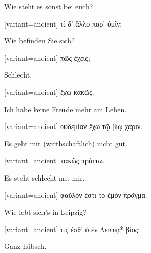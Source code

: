 Wie steht es sonst bei euch?

\switchcolumn

\begin{greek}[variant=ancient]%
τί δ' ἄλλο παρ' ὑμῖν;

\end{greek}%
\switchcolumn*

Wie befinden Sie sich?

\switchcolumn

\begin{greek}[variant=ancient]%
πῶς ἔχεις;

\end{greek}%
\switchcolumn*

Schlecht.

\switchcolumn

\begin{greek}[variant=ancient]%
ἔχω κακῶς.

\end{greek}%
\switchcolumn*

Ich habe keine Freude mehr am Leben.

\switchcolumn

\begin{greek}[variant=ancient]%
οὐδεμίαν ἔχω τῷ βίῳ χάριν.

\end{greek}%
\switchcolumn*

Es geht mir (wirthschaftlich) nicht gut.

\switchcolumn

\begin{greek}[variant=ancient]%
κακῶς πράττω.

\end{greek}%
\switchcolumn*

Es steht schlecht mit mir.

\switchcolumn

\begin{greek}[variant=ancient]%
φαῦλόν ἐστι τὸ ἐμὸν πρᾶγμα.

\end{greek}%
\switchcolumn*

Wie lebt sich's in Leipzig?

\switchcolumn

\begin{greek}[variant=ancient]%
τίς ἐσθ' ὁ ἐν Λειψίᾳ{*} βίος;

\end{greek}%
\switchcolumn*

Ganz hübsch.

